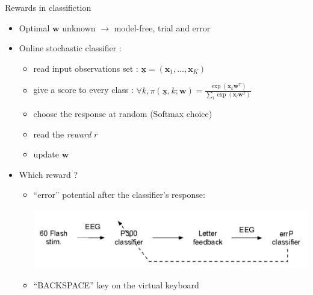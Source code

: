 \documentclass{beamer}
\begin{document}
\begin{frame}{Rewards in classifiction}
	\vspace{-1cm}
 \begin{itemize}
  \item Optimal $\boldsymbol{w}$ unknown $\rightarrow$ model-free, trial and error
  \item Online stochastic classifier :
  \begin{itemize}
    \item read input observations set : $\underline{\mathbf{x}} = (\boldsymbol{x}_1,...,\boldsymbol{x}_K)$
    \item give a score to every class : $\forall k, \pi(\underline{\mathbf{x}},k;\boldsymbol{w}) =  \frac{\exp(\boldsymbol{x}_k \boldsymbol{w}^T)}
                                             {\sum_{l}  \exp(\boldsymbol{x}_l \boldsymbol{w}^T)}$ 
    \item choose the response at random (Softmax choice)
    \item read the \emph{reward} $r$
    \item update $\boldsymbol{w}$
  \end{itemize}
  \item Which reward ?
  \begin{itemize}
    \item ``error'' potential after the classifier's response:
 \centerline{\includegraphics[width=0.7\linewidth]{online_P300.pdf}}
    \item ``BACKSPACE'' key on the virtual keyboard
  \end{itemize}
 \end{itemize}
\end{frame}
\end{document}
